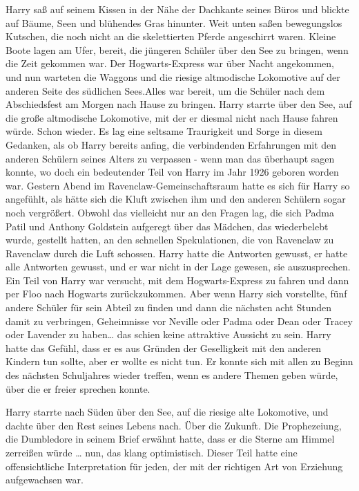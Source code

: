 {Harry saß auf seinem Kissen in der Nähe der Dachkante seines Büros und blickte auf Bäume, Seen und blühendes Gras hinunter. Weit unten saßen bewegungslos Kutschen, die noch nicht an die skelettierten Pferde angeschirrt waren. Kleine Boote lagen am Ufer, bereit, die jüngeren Schüler über den See zu bringen, wenn die Zeit gekommen war. Der Hogwarts-Express war über Nacht angekommen, und nun warteten die Waggons und die riesige altmodische Lokomotive auf der anderen Seite des südlichen Sees.Alles war bereit, um die Schüler nach dem Abschiedsfest am Morgen nach Hause zu bringen. Harry starrte über den See, auf die große altmodische Lokomotive, mit der er diesmal nicht nach Hause fahren würde. Schon wieder. Es lag eine seltsame Traurigkeit und Sorge in diesem Gedanken, als ob Harry bereits anfing, die verbindenden Erfahrungen mit den anderen Schülern seines Alters zu verpassen - wenn man das überhaupt sagen konnte, wo doch ein bedeutender Teil von Harry im Jahr 1926 geboren worden war. Gestern Abend im Ravenclaw-Gemeinschaftsraum hatte es sich für Harry so angefühlt, als hätte sich die Kluft zwischen ihm und den anderen Schülern sogar noch vergrößert. Obwohl das vielleicht nur an den Fragen lag, die sich Padma Patil und Anthony Goldstein aufgeregt über das Mädchen, das wiederbelebt wurde, gestellt hatten, an den schnellen Spekulationen, die von Ravenclaw zu Ravenclaw durch die Luft schossen. Harry hatte die Antworten gewusst, er hatte alle Antworten gewusst, und er war nicht in der Lage gewesen, sie auszusprechen. Ein Teil von Harry war versucht, mit dem Hogwarts-Express zu fahren und dann per Floo nach Hogwarts zurückzukommen. Aber wenn Harry sich vorstellte, fünf andere Schüler für sein Abteil zu finden und dann die nächsten acht Stunden damit zu verbringen, Geheimnisse vor Neville oder Padma oder Dean oder Tracey oder Lavender zu haben… das schien keine attraktive Aussicht zu sein. Harry hatte das Gefühl, dass er es aus Gründen der Geselligkeit mit den anderen Kindern tun sollte, aber er wollte es nicht tun. Er konnte sich mit allen zu Beginn des nächsten Schuljahres wieder treffen, wenn es andere Themen geben würde, über die er freier sprechen konnte.

Harry starrte nach Süden über den See, auf die riesige alte Lokomotive, und dachte über den Rest seines Lebens nach. Über die Zukunft. Die Prophezeiung, die Dumbledore in seinem Brief erwähnt hatte, dass er die Sterne am Himmel zerreißen würde … nun, das klang optimistisch. Dieser Teil hatte eine offensichtliche Interpretation für jeden, der mit der richtigen Art von Erziehung aufgewachsen war.

}
